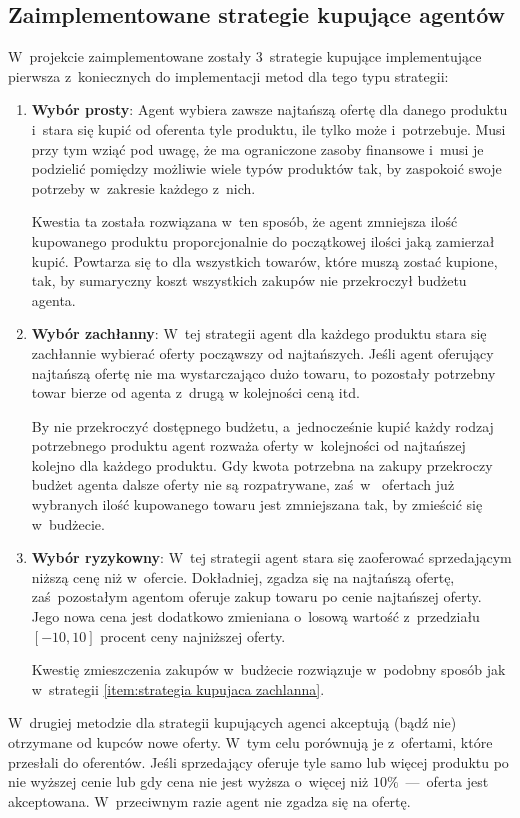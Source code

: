 \documentclass[12pt]{article}
\begin{document}
\subsection{Zaimplementowane strategie kupujące agentów}
W~projekcie zaimplementowane zostały 3~strategie kupujące implementujące pierwsza z~koniecznych do implementacji metod dla tego typu strategii:
\begin{enumerate}
 \item \textbf{Wybór prosty}: Agent wybiera zawsze najtańszą ofertę dla danego produktu i~stara się kupić od oferenta tyle produktu, ile tylko może i~potrzebuje.
Musi przy tym wziąć pod uwagę, że ma ograniczone zasoby finansowe i~musi je podzielić pomiędzy możliwie wiele typów produktów tak, by zaspokoić swoje potrzeby w~zakresie każdego z~nich.

Kwestia ta została rozwiązana w~ten sposób, że agent zmniejsza ilość kupowanego produktu proporcjonalnie do początkowej ilości jaką zamierzał kupić.
Powtarza się to dla wszystkich towarów, które muszą zostać kupione, tak, by sumaryczny koszt wszystkich zakupów nie przekroczył budżetu agenta.
 \item \textbf{Wybór zachłanny}: W~tej strategii agent dla każdego produktu stara się zachłannie wybierać oferty począwszy od najtańszych. 
Jeśli agent oferujący najtańszą ofertę nie ma wystarczająco dużo towaru, to pozostały potrzebny towar bierze od agenta z~drugą w kolejności ceną itd.

By nie przekroczyć dostępnego budżetu, a~jednocześnie kupić każdy rodzaj potrzebnego produktu agent rozważa oferty w~kolejności od najtańszej kolejno dla każdego produktu. Gdy kwota potrzebna na zakupy
przekroczy budżet agenta dalsze oferty nie są rozpatrywane, zaś~w~ ofertach już wybranych ilość kupowanego towaru jest zmniejszana tak, by zmieścić się w~budżecie.
 \label{item:strategia kupujaca zachlanna} 
 \item \textbf{Wybór ryzykowny}: W~tej strategii agent stara się zaoferować sprzedającym niższą cenę niż w~ofercie. Dokładniej, zgadza się na najtańszą ofertę, zaś~pozostałym agentom
oferuje zakup towaru po cenie najtańszej oferty. Jego nowa cena jest dodatkowo zmieniana o~losową wartość z~przedziału $[-10, 10]$ procent ceny najniższej oferty.

Kwestię zmieszczenia zakupów w~budżecie rozwiązuje w~podobny sposób jak w~strategii \ref{item:strategia kupujaca zachlanna}.
\end{enumerate}

W~drugiej metodzie dla strategii kupujących agenci akceptują (bądź nie) otrzymane od kupców nowe oferty. W~tym celu porównują je z~ofertami, które przesłali do oferentów. Jeśli sprzedający oferuje tyle samo
lub więcej produktu po nie wyższej cenie lub gdy cena nie jest wyższa o~więcej niż $10\%$~---~oferta jest akceptowana. W~przeciwnym razie agent nie zgadza się na ofertę.
\end{document}
